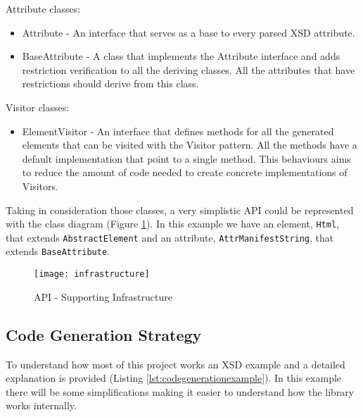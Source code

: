Attribute classes:

\begin{itemize}  
	\item Attribute - An interface that serves as a base to every parsed \ac{XSD} attribute.
	\item BaseAttribute - A class that implements the Attribute interface and adds restriction verification to all the deriving classes. All the attributes that have restrictions should derive from this class.
\end{itemize}

Visitor classes:

\begin{itemize}
	\item ElementVisitor - An interface that defines methods for all the generated elements that can be visited with the Visitor pattern. All the methods have a default implementation that point to a single method. This behaviours aims to reduce the amount of code needed to create concrete implementations of  Visitors.
\end{itemize}

\noindent
Taking in consideration those classes, a very simplistic \ac{API} could be represented with the class diagram (Figure \ref{img:infrastructure}). In this example we have an element, \texttt{Html}, that extends \texttt{AbstractElement} and an attribute, \texttt{AttrManifestString}, that extends \texttt{BaseAttribute}. 

\begin{figure}[h]
	\centering
	\texttt{[image: infrastructure]}
	\caption{API - Supporting Infrastructure}
	\label{img:infrastructure}
\end{figure}

\subsection{Code Generation Strategy}
\label{sec:codegenerationstrategy}

\noindent
To understand how most of this project works an \ac{XSD} example and a detailed explanation is provided (Listing \ref{lst:codegenerationexample}). In this example there will be some simplifications making it easier to understand how the library works internally.

\bigskip


